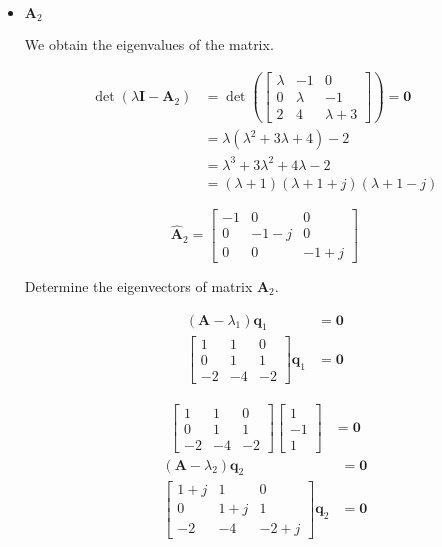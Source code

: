 \begin{itemize}
 \item $\mathbf{A}_2$

 We obtain the eigenvalues of the matrix.

 \begin{align*}
  \det(\lambda \mathbf{I} - \mathbf{A}_2) &=
  \det(\begin{bmatrix}
       \lambda & -1 & 0 \\
       0 & \lambda & -1 \\
       2 & 4 & \lambda+3
      \end{bmatrix})=\mathbf{0}\\
      &= \lambda (\lambda^2 +3\lambda +4) -2\\
      &= \lambda^3 +3\lambda^2 + 4 \lambda -2\\
      &= (\lambda +1) (\lambda +1 + j) (\lambda +1 - j)
 \end{align*}


  \begin{equation*}
  \hat{\mathbf{A}}_2 = \begin{bmatrix}
                        -1 & 0 &0\\0 & -1-j & 0\\0 & 0&-1+j
                       \end{bmatrix}
 \end{equation*}

 Determine the eigenvectors of matrix $\mathbf{A}_2$.

\begin{align*}
 (\mathbf{A}-\lambda_1) \mathbf{q}_1 &= \mathbf{0}\\
 \begin{bmatrix}
    1 & 1 & 0 \\
     0 & 1 & 1 \\
    -2 & -4 & -2
    \end{bmatrix}\mathbf{q}_1 &= \mathbf{0}
\end{align*}

\begin{align*}
  \begin{bmatrix}
     1 & 1 & 0 \\
     0 & 1 & 1 \\
    -2 & -4 & -2
    \end{bmatrix}
    \begin{bmatrix}
     1 \\ -1 \\ 1
    \end{bmatrix}
    &= \mathbf{0}
\end{align*}
\begin{align*}
 (\mathbf{A}-\lambda_2) \mathbf{q}_2 &= \mathbf{0}\\
 \begin{bmatrix}
     1+j & 1 & 0 \\
     0 & 1+j & 1 \\
    -2 & -4 & -2+j
    \end{bmatrix}\mathbf{q}_2 &= \mathbf{0}
\end{align*}


\end{itemize}
